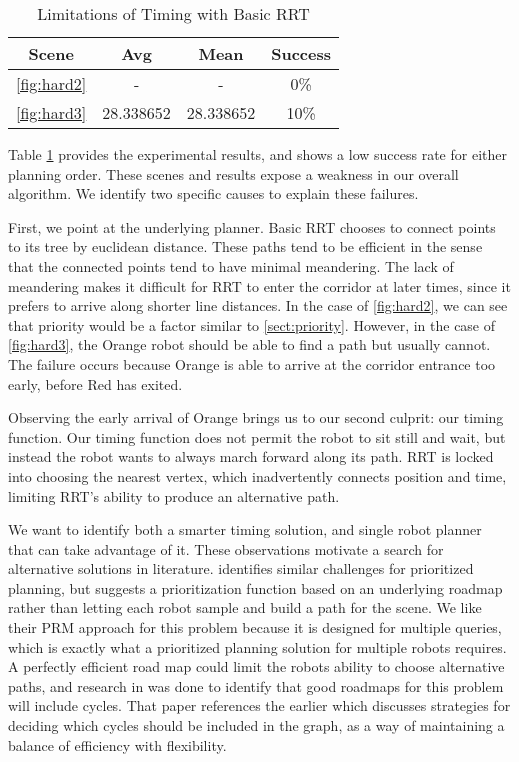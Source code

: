 \documentclass[12pt,journal,compsoc]{IEEEtran}
\begin{document}
\begin{table}[ht]
\renewcommand{\arraystretch}{1.3}
\caption{Limitations of Timing with Basic RRT}
\label{hardresults}
\centering 
\begin{tabular}{||c||c||c||c||}
\hline
\bfseries Scene & \bfseries Avg & \bfseries Mean & \bfseries Success\\
\hline\hline
\ref{fig:hard2} & - & - & 0\%\\
\hline
\ref{fig:hard3} & 28.338652 & 28.338652 & 10\%\\
\hline
\hline
\end{tabular}
\end{table}
Table \ref{hardresults} provides the experimental results, and shows a low success rate for either planning order. These scenes and results expose a weakness in our overall algorithm. We identify two specific causes to explain these failures. 
\par
First, we point at the underlying planner. Basic RRT chooses to connect points to its tree by euclidean distance. These paths tend to be efficient in the sense that the connected points tend to have minimal meandering. The lack of meandering makes it difficult for RRT to enter the corridor at later times, since it prefers to arrive along shorter line distances. In the case of \ref{fig:hard2}, we can see that priority would be a factor similar to \ref{sect:priority}. However, in the case of \ref{fig:hard3}, the Orange robot should be able to find a path but usually cannot. The failure occurs because Orange is able to arrive at the corridor entrance too early, before Red has exited.
\par
Observing the early arrival of Orange brings us to our second culprit: our timing function. Our timing function does not permit the robot to sit still and wait, but instead the robot wants to always march forward along its path. RRT is locked into choosing the nearest vertex, which inadvertently connects position and time, limiting RRT's ability to produce an alternative path.
\par
We want to identify both a smarter timing solution, and single robot planner that can take advantage of it. These observations motivate a search for alternative solutions in literature. \cite{bergprm} identifies similar challenges for prioritized planning, but suggests a prioritization function based on an underlying roadmap rather than letting each robot sample and build a path for the scene. We like their PRM approach for this problem because it is designed for multiple queries, which is exactly what a prioritized planning solution for multiple robots requires. A perfectly efficient road map could limit the robots ability to choose alternative paths, and research in \cite{bergprm} was done to identify that good roadmaps for this problem will include cycles. That paper references the earlier \cite{overcycles} which discusses strategies for deciding which cycles should be included in the graph, as a way of maintaining a balance of efficiency with flexibility.
\end{document}
